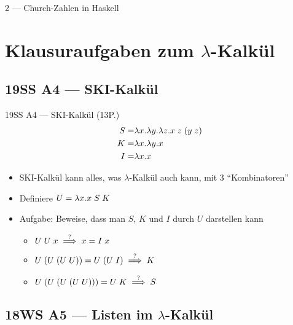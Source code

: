 \documentclass{beamer}
\newcommand{\code}[1]{
	\begin{mdframed}
		
	\end{mdframed}
}
\begin{document}
\begin{frame}{2 --- Church-Zahlen in Haskell}
	\code{demos/ChurchNumbers.hs}
\end{frame}

\section{Klausuraufgaben zum $\lambda$-Kalkül}

\subsection{19SS A4 --- SKI-Kalkül}

\begin{frame}{19SS A4 --- SKI-Kalkül (13P.)}
	\begin{eqnarray*}
		S =& \lambda{}x.\lambda{}y.\lambda{}z.x\;{}z\;{}(y\;{}z) \\
		K =& \lambda{}x.\lambda{}y.x \\
		I =& \lambda{}x.x
	\end{eqnarray*}

	\begin{itemize}
		\item SKI-Kalkül kann alles, was $\lambda$-Kalkül auch kann, mit 3 \enquote{Kombinatoren}
		\item Definiere $U = \lambda{}x.x\;{}S\;{}K$
		\item Aufgabe: Beweise, dass man $S$, $K$ und $I$ durch $U$ darstellen kann
		\pause
		\begin{itemize}
			\item $U\;{}U\;{}x \stackrel{?}{\implies} x = I\;{}x$
			\item $U\;{}(U\;{}(U\;{}U)) = U\;{}(U\;{}I) \stackrel{?}{\implies} K$
			\item $U\;{}(U\;{}(U\;{}(U\;{}U))) = U\;{}K \stackrel{?}{\implies} S$
		\end{itemize}
	\end{itemize}
\end{frame}

\subsection{18WS A5 --- Listen im $\lambda$-Kalkül}
\end{document}
